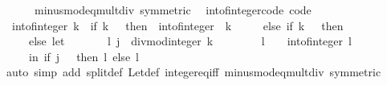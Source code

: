 \begin{isabellebody}
\ \ \ \ \ \ minus{\isacharunderscore}{\kern0pt}mod{\isacharunderscore}{\kern0pt}eq{\isacharunderscore}{\kern0pt}mult{\isacharunderscore}{\kern0pt}div\ {\isacharbrackleft}{\kern0pt}symmetric{\isacharbrackright}{\kern0pt}\ {\isacharasterisk}{\kern0pt}{\isacharparenright}{\kern0pt}\isanewline
{}\isamarkupfalse%
%
\endisatagproof
{\isafoldproof}%
%
\isadelimproof
\isanewline
%
\endisadelimproof
\isanewline
{}\isamarkupfalse%
\ int{\isacharunderscore}{\kern0pt}of{\isacharunderscore}{\kern0pt}integer{\isacharunderscore}{\kern0pt}code\ {\isacharbrackleft}{\kern0pt}code{\isacharbrackright}{\kern0pt}{\isacharcolon}{\kern0pt}\isanewline
\ \ {\isachardoublequoteopen}int{\isacharunderscore}{\kern0pt}of{\isacharunderscore}{\kern0pt}integer\ k\ {\isacharequal}{\kern0pt}\ {\isacharparenleft}{\kern0pt}if\ k\ {\isacharless}{\kern0pt}\ {}\ then\ {\isacharminus}{\kern0pt}\ {\isacharparenleft}{\kern0pt}int{\isacharunderscore}{\kern0pt}of{\isacharunderscore}{\kern0pt}integer\ {\isacharparenleft}{\kern0pt}{\isacharminus}{\kern0pt}\ k{\isacharparenright}{\kern0pt}{\isacharparenright}{\kern0pt}\isanewline
\ \ \ \ \ else\ if\ k\ {\isacharequal}{\kern0pt}\ {}\ then\ {}\isanewline
\ \ \ \ \ else\ let\isanewline
\ \ \ \ \ \ \ {\isacharparenleft}{\kern0pt}l{\isacharcomma}{\kern0pt}\ j{\isacharparenright}{\kern0pt}\ {\isacharequal}{\kern0pt}\ divmod{\isacharunderscore}{\kern0pt}integer\ k\ {}{\isacharsemicolon}{\kern0pt}\isanewline
\ \ \ \ \ \ \ l{\isacharprime}{\kern0pt}\ {\isacharequal}{\kern0pt}\ {}\ {\isacharasterisk}{\kern0pt}\ int{\isacharunderscore}{\kern0pt}of{\isacharunderscore}{\kern0pt}integer\ l\isanewline
\ \ \ \ \ in\ if\ j\ {\isacharequal}{\kern0pt}\ {}\ then\ l{\isacharprime}{\kern0pt}\ else\ l{\isacharprime}{\kern0pt}\ {\isacharplus}{\kern0pt}\ {}{\isacharparenright}{\kern0pt}{\isachardoublequoteclose}\isanewline
%
\isadelimproof
\ \ %
\endisadelimproof
%
\isatagproof
{}\isamarkupfalse%
\ {\isacharparenleft}{\kern0pt}auto\ simp\ add{\isacharcolon}{\kern0pt}\ split{\isacharunderscore}{\kern0pt}def\ Let{\isacharunderscore}{\kern0pt}def\ integer{\isacharunderscore}{\kern0pt}eq{\isacharunderscore}{\kern0pt}iff\ minus{\isacharunderscore}{\kern0pt}mod{\isacharunderscore}{\kern0pt}eq{\isacharunderscore}{\kern0pt}mult{\isacharunderscore}{\kern0pt}div\ {\isacharbrackleft}{\kern0pt}symmetric{\isacharbrackright}{\kern0pt}{\isacharparenright}{\kern0pt}%
\endisatagproof
{\isafoldproof}%
%
\isadelimproof
\isanewline
%
\endisadelimproof
\isanewline
{}\isamarkupfalse%

\end{isabellebody}
